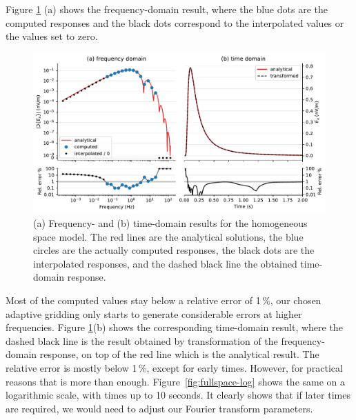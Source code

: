 \documentclass[extra, camera,%
]{gji}
\newlength{\fwidth}
\begin{document}
Figure \ref{fig:fullspace} (a) shows the frequency-domain result, where the
blue dots are the computed responses and the black dots correspond to the
interpolated values or the values set to zero.
%
\begin{figure}
  \centering
  \includegraphics[width=\fwidth]{04-fullspace}
  \caption{(a) Frequency- and (b) time-domain results for the homogeneous space
    model. The red lines are the analytical solutions, the blue circles are the
    actually computed responses, the black dots are the interpolated responses,
    and the dashed black line the obtained time-domain response.}
  \label{fig:fullspace}
\end{figure}
%
Most of the computed values stay below a relative error of 1\,\%, our chosen
adaptive gridding only starts to generate considerable errors at higher
frequencies. Figure \ref{fig:fullspace}(b) shows the corresponding time-domain
result, where the dashed black line is the result obtained by transformation of
the frequency-domain response, on top of the red line which is the analytical
result. The relative error is mostly below 1\,\%, except for early times.
However, for practical reasons that is more than enough.
Figure~\ref{fig:fullspace-log} shows the same on a logarithmic scale, with
times up to 10 seconds. It clearly shows that if later times are required, we
would need to adjust our Fourier transform parameters.
%
\end{document}
